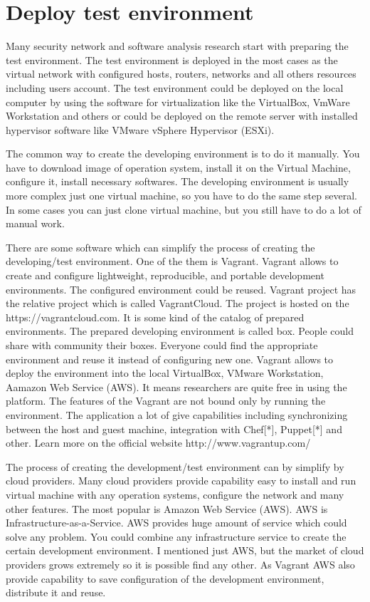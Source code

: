 \documentclass{article}
\begin{document}
\section{Deploy test environment}
Many security network and software analysis research start with preparing the test environment. The test environment is deployed in the most cases as the virtual network with configured hosts, routers, networks and all others resources including users account. The test environment could be deployed on the local computer by using the software for virtualization like the VirtualBox, VmWare Workstation and others or could be deployed on the remote server with installed hypervisor software like VMware vSphere Hypervisor (ESXi).          

The common way to create the developing environment is to do it manually. You have to download image of operation system, install it on the Virtual Machine, configure it, install necessary softwares. The developing environment is usually more complex just one virtual machine, so you have to do the same step several. In some cases you can just clone virtual machine, but you still have to do a lot of manual work.       
  
There are some software which can simplify the process of creating the developing/test environment. One of the them is Vagrant. Vagrant allows to create and configure lightweight, reproducible, and portable development environments. The configured environment could be reused. Vagrant project has the relative project which is called VagrantCloud. The project is hosted on the https://vagrantcloud.com. It is some kind of the catalog of prepared environments. The prepared developing environment is called box.  People could share with community their boxes. Everyone could find the appropriate environment and reuse it instead of configuring new one. Vagrant allows to deploy the environment into the local VirtualBox, VMware Workstation, Aamazon Web Service (AWS). It means researchers are quite free in using the platform. The features of the Vagrant are not bound only by running the environment. The application a lot of give capabilities including synchronizing between the host and guest machine, integration with Chef[*], Puppet[*] and other. Learn more on the official website http://www.vagrantup.com/ 

The process of creating the development/test environment can by simplify by cloud providers. Many cloud providers provide capability easy to install and run virtual machine with any operation systems, configure the network and many other features. The most popular is Amazon Web Service (AWS). AWS is Infrastructure-as-a-Service. AWS provides huge amount of service which could solve any problem.  You could combine any infrastructure service to create the certain development environment. I mentioned just AWS, but the market of cloud providers grows extremely so it is possible find any other. As Vagrant AWS also provide capability to save configuration of the development environment, distribute it and reuse.
\end{document}
